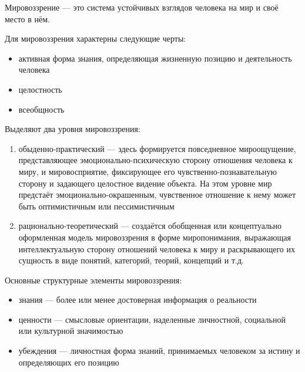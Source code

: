 Мировоззрение --- это система устойчивых взглядов человека на мир и своё место в нём.

Для мировоззрения характерны следующие черты:
\begin{itemize}
	\item активная форма знания, определяющая жизненную позицию и деятельность человека
	\item целостность
	\item всеобщность
\end{itemize}

Выделяют два уровня мировоззрения:
\begin{enumerate}
	\item обыденно-практический --- здесь формируется повседневное мироощущение, представляющее эмоционально-психическую сторону отношения человека к миру, и мировосприятие, фиксирующее его чувственно-познавательную сторону и задающего целостное видение объекта. На этом уровне мир предстаёт эмоционально-окрашенным, чувственное отношение к нему может быть оптимистичным или пессимистичным
	\item рационально-теоретический --- создаётся обобщенная или концептуально оформленная модель мировоззрения в форме миропонимания, выражающая интеллектуальную сторону отношений человека к миру и раскрывающего их сущность в виде понятий, категорий, теорий, концепций и т.д.
\end{enumerate}

Основные структурные элементы мировоззрения:
\begin{itemize}
	\item знания --- более или менее достоверная информация о реальности
	\item ценности --- смысловые ориентации, наделенные личностной, социальной или культурной значимостью
	\item убеждения --- личностная форма знаний, принимаемых человеком за истину и определяющих его позицию
\end{itemize}

